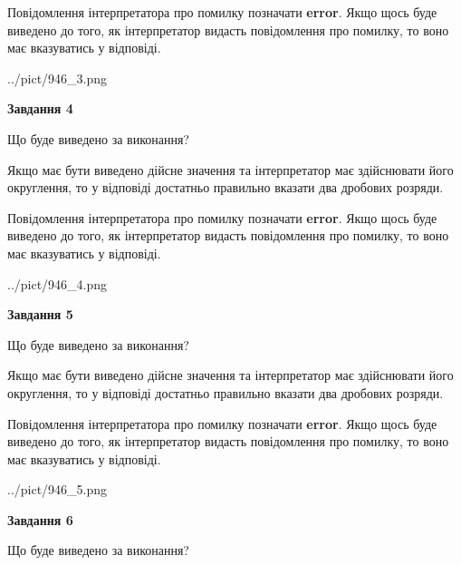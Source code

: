 \documentclass[12pt, ukrainian]{article}
\begin{document}
{\begin {Large}
Повідомлення інтерпретатора про помилку позначати \textbf{error}.
Якщо щось буде виведено до того, як інтерпретатор видасть повідомлення про помилку, 
то воно має вказуватись у відповіді. \par

\begin{center}
	{../pict/946_3.png}
\end{center}
\newpage

{\begin {center}\textbf{Завдання 4}\end {center}}\par
Що буде виведено за виконання? \par

Якщо має бути виведено дійсне значення та інтерпретатор має здійснювати його округлення, 
то у відповіді достатньо правильно вказати два дробових розряди.

Повідомлення інтерпретатора про помилку позначати \textbf{error}.
Якщо щось буде виведено до того, як інтерпретатор видасть повідомлення про помилку, 
то воно має вказуватись у відповіді. \par

\begin{center}
	{../pict/946_4.png}
\end{center}
\newpage

{\begin {center}\textbf{Завдання 5}\end {center}}\par
Що буде виведено за виконання? \par

Якщо має бути виведено дійсне значення та інтерпретатор має здійснювати його округлення, 
то у відповіді достатньо правильно вказати два дробових розряди.

Повідомлення інтерпретатора про помилку позначати \textbf{error}.
Якщо щось буде виведено до того, як інтерпретатор видасть повідомлення про помилку, 
то воно має вказуватись у відповіді. \par

\begin{center}
	{../pict/946_5.png}
\end{center}
\newpage

{\begin {center}\textbf{Завдання 6}\end {center}}\par
Що буде виведено за виконання? \par


\end{Large}}
\end{document}
